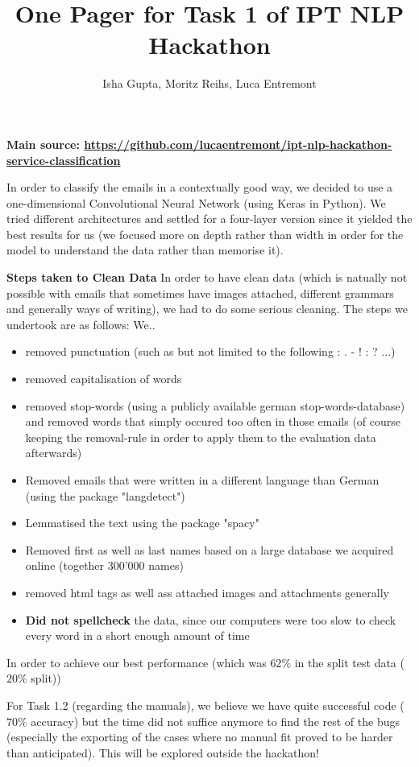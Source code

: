 \documentclass[11pt,a4paper]{article}
\title{One Pager for Task 1 of IPT NLP Hackathon}
\begin{document}
\author{Isha Gupta, Moritz Reihs, Luca Entremont}
\date{}
\maketitle{}
\textbf{Main source: \href{https://github.com/lucaentremont/ipt-nlp-hackathon-service-classification}{https://github.com/lucaentremont/ipt-nlp-hackathon-service-classification}}
\\
\noindent\makebox[\linewidth]{\rule{\paperwidth}{0.4pt}}

In order to classify the emails in a contextually good way, we decided to use a one-dimensional Convolutional Neural Network (using Keras in Python). We tried different architectures and settled for a four-layer version since it yielded the best results for us (we focused more on depth rather than width in order for the model to understand the data rather than memorise it).

\textbf{Steps taken to Clean Data}
In order to have clean data (which is natually not possible with emails that sometimes have images attached, different grammars and generally ways of writing), we had to do some serious cleaning. The steps we undertook are as follows: We..
\begin{itemize}
	\item removed punctuation (such as but not limited to the following : . - ! : ? ...)
	\item removed capitalisation of words
	\item removed stop-words (using a publicly available german stop-words-database) and removed words that simply occured too often in those emails (of course keeping the removal-rule in order to apply them to the evaluation data afterwards)
	\item Removed emails that were written in a different language than German (using the package "langdetect")
	\item Lemmatised the text using the package "spacy"
	\item Removed first as well as last names based on a large database we acquired online (together 300'000 names)
	\item removed html tags as well ass attached images and attachments generally
	\item \textbf{Did not spellcheck} the data, since our computers were too slow to check every word in a short enough amount of time
\end{itemize}

In order to achieve our best performance (which was $62\%$ in the split test data ($20\%$ split))

For Task 1.2 (regarding the manuals), we believe we have quite successful code ($70\%$ accuracy) but the time did not suffice anymore to find the rest of the bugs (especially the exporting of the cases where no manual fit proved to be harder than anticipated). This will be explored outside the hackathon!
\end{document}
